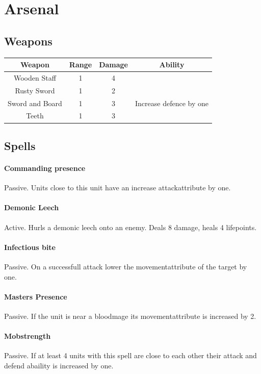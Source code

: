 \documentclass[a5paper,pagesize,10pt,bibtotoc,pointlessnumbers,
normalheadings,DIV=9,twoside=false]{scrbook}
\begin{document}
\chapter{Arsenal}

\section{Weapons}

 \begin{tabular}{||c c c c||} 
 \hline
 Weapon & Range & Damage & Ability \\
\hline \hline
Wooden Staff & 1 & 4 &  \\
\hline
Rusty Sword & 1 & 2 &  \\
\hline
Sword and Board & 1 & 3 & Increase defence by one \\
\hline
Teeth & 1 & 3 & \\
\hline
 
 \end{tabular}
\newpage
\section{Spells}

\subsubsection{Commanding presence}
Passive. Units close to this unit have an increase attackattribute by one.

\subsubsection{Demonic Leech}
Active. Hurls a demonic leech onto an enemy. Deals 8 damage, heals 4 lifepoints.

\subsubsection{Infectious bite}
Passive. On a successfull attack lower the movementattribute of the target by one.

\subsubsection{Masters Presence}
Passive. If the unit is near a bloodmage its movementattribute is increased by 2.

\subsubsection{Mobstrength}
Passive. If at least 4 units with this spell are close to each other their attack and defend abaility is increased by one.
\end{document}
